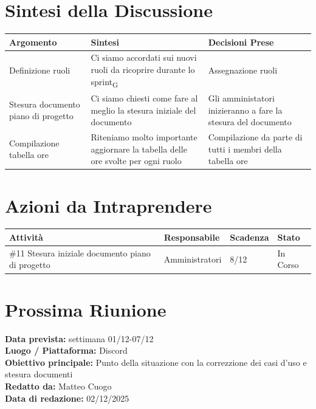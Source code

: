 \documentclass[a4paper,12pt]{article}
\newcommand{\gls}[1]{#1\textsubscript{G}}
\begin{document}
\section*{ Sintesi della Discussione}

\begin{longtable}{|p{}|p{}|p{}|}
\hline
\textbf{Argomento} & \textbf{Sintesi} & \textbf{Decisioni Prese} \\ \hline
 Definizione ruoli&Ci siamo accordati sui nuovi ruoli da ricoprire durante lo \gls{sprint}&Assegnazione ruoli   \\ \hline

 Stesura documento piano di progetto&Ci siamo chiesti come fare al meglio la stesura iniziale del documento&Gli amministatori inizieranno a fare la stesura del documento   \\ \hline

Compilazione tabella ore&Riteniamo molto importante aggiornare la tabella delle ore svolte per ogni ruolo&Compilazione da parte di tutti i membri della tabella ore \\ \hline

\end{longtable}

\clearpage
\section*{ Azioni da Intraprendere}

\begin{longtable}{|p{}|p{}|p{}|p{}|}
\hline
\textbf{Attività} & \textbf{Responsabile} & \textbf{Scadenza} & \textbf{Stato} \\ \hline
\#11 Stesura iniziale documento piano di progetto& Amministratori  &8/12  &In Corso  \\ \hline

\end{longtable}


\section*{ Prossima Riunione}
\textbf{Data prevista:} settimana 01/12-07/12  \\
\textbf{Luogo / Piattaforma:} Discord \\
\textbf{Obiettivo principale:} Punto della situazione con la correzzione dei casi d'uso e stesura documenti\\


\textbf{Redatto da:} Matteo Cuogo \\
\textbf{Data di redazione:} 02/12/2025
\end{document}

